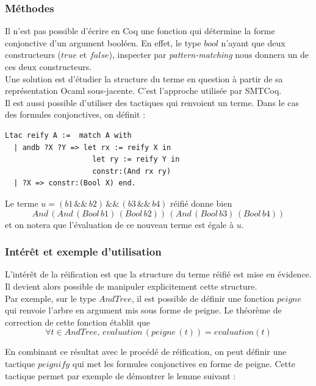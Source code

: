 \documentclass[11pt]{article}
\begin{document}
\subsubsection{Méthodes}

Il n'est pas possible d'écrire en Coq une fonction qui détermine la forme conjonctive d'un argument booléen. En effet, le type $bool$ n'ayant que deux constructeurs ($true$ et $false$), inspecter par \textit{pattern-matching} nous donnera un de ces deux constructeurs.\\

Une solution est d'étudier la structure du terme en question à partir de sa représentation Ocaml sous-jacente. C'est l'approche utilisée par SMTCoq. \\

Il est aussi possible d'utiliser des tactiques qui renvoient un terme. Dans le cas des formules conjonctives, on définit :

\begin{lstlisting}[frame=single]
Ltac reify A :=  match A with
  | andb ?X ?Y => let rx := reify X in
                    let ry := reify Y in
                    constr:(And rx ry)
  | ?X => constr:(Bool X) end.

\end{lstlisting}

Le terme $u = (b1\,\&\&\,b2)\,\&\&\,(b3\,\&\&\,b4)$ réifié donne bien 
\[And\,(And\,(Bool\,b1)\,(Bool\,b2))\,(And\,(Bool\,b3)\,(Bool\,b4))\] 
et on notera que l'évaluation de ce nouveau terme est égale à $u$.



\subsubsection{Intérêt et exemple d'utilisation}

L'intérêt de la réification est que la structure du terme réifié est mise en évidence. Il devient alors possible de manipuler explicitement cette structure. \\

Par exemple, sur le type $AndTree$, il est possible de définir une fonction $peigne$ qui renvoie l'arbre en argument mis sous forme de peigne. Le théorème de correction de cette fonction établit que 
\[ \forall t \in AndTree, \, evaluation \, (peigne \, (t)) = evaluation (t) \]

En combinant ce résultat avec le procédé de réification, on peut définir une tactique $peignify$ qui met les formules conjonctives en forme de peigne. Cette tactique permet par exemple de démontrer le lemme suivant : 
\end{document}

